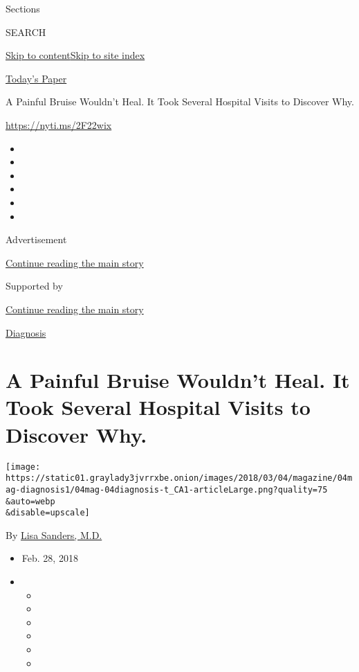 Sections

SEARCH

\protect\hyperlink{site-content}{Skip to
content}\protect\hyperlink{site-index}{Skip to site index}

\href{https://myaccount.nytimes3xbfgragh.onion/auth/login?response_type=cookie\&client_id=vi}{}

\href{https://www.nytimes3xbfgragh.onion/section/todayspaper}{Today's
Paper}

A Painful Bruise Wouldn't Heal. It Took Several Hospital Visits to
Discover Why.

\url{https://nyti.ms/2F22wix}

\begin{itemize}
\item
\item
\item
\item
\item
\item
\end{itemize}

Advertisement

\protect\hyperlink{after-top}{Continue reading the main story}

Supported by

\protect\hyperlink{after-sponsor}{Continue reading the main story}

\href{/column/diagnosis}{Diagnosis}

\hypertarget{a-painful-bruise-wouldnt-heal-it-took-several-hospital-visits-to-discover-why}{%
\section{A Painful Bruise Wouldn't Heal. It Took Several Hospital Visits
to Discover
Why.}\label{a-painful-bruise-wouldnt-heal-it-took-several-hospital-visits-to-discover-why}}

\texttt{[image: https://static01.graylady3jvrrxbe.onion/images/2018/03/04/magazine/04mag-diagnosis1/04mag-04diagnosis-t\_CA1-articleLarge.png?quality=75\\\&auto=webp\\\&disable=upscale]}

By \href{https://www.nytimes3xbfgragh.onion/by/lisa-sanders-md}{Lisa
Sanders, M.D.}

\begin{itemize}
\item
  Feb. 28, 2018
\item
  \begin{itemize}
  \item
  \item
  \item
  \item
  \item
  \item
  \end{itemize}
\end{itemize}

